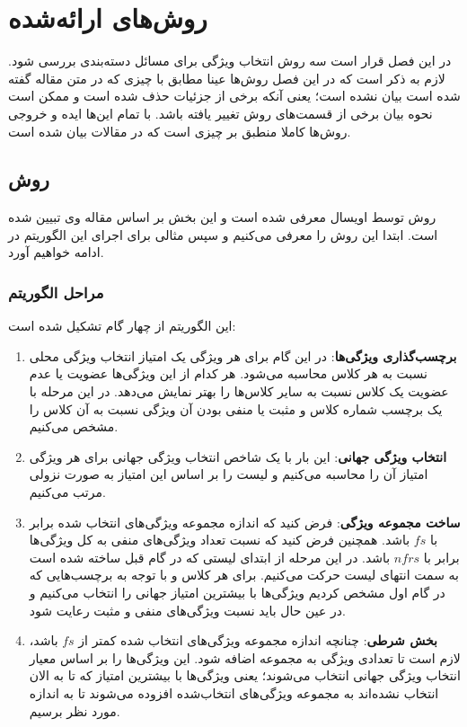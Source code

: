 \chapter{روش‌های ارائه‌شده}
در این فصل قرار است سه روش انتخاب ویژگی برای مسائل دسته‌بندی بررسی شود. لازم به ذکر است که در این فصل روش‌ها عینا مطابق با چیزی که در متن مقاله گفته شده است بیان نشده است؛ یعنی آنکه برخی از جزئیات حذف شده است و ممکن است نحوه بیان برخی از قسمت‌های روش تغییر یافته باشد. با تمام این‌ها ایده و خروجی روش‌ها کاملا منطبق بر چیزی است که در مقالات بیان شده است.


\section{روش } 
روش  توسط اویسال معرفی شده است\cite{uysal2016improved} و این بخش بر اساس مقاله وی تبیین شده است. ابتدا این روش را معرفی می‌کنیم و سپس مثالی برای اجرای این الگوریتم در ادامه خواهیم آورد.
\subsection{مراحل الگوریتم}
این الگوریتم از چهار گام تشکیل شده است:
\begin{enumerate}
\item \textbf{برچسب‌گذاری ویژگی‌ها}: در این گام برای هر ویژگی یک امتیاز انتخاب ویژگی محلی نسبت به هر کلاس محاسبه می‌شود. هر کدام از این ویژگی‌ها عضویت یا عدم عضویت یک کلاس نسبت به سایر کلاس‌ها را بهتر نمایش می‌دهد. در این مرحله با یک برچسب شماره کلاس و مثبت یا منفی بودن آن ویژگی نسبت به آن کلاس را مشخص می‌کنیم. 
\item \textbf{انتخاب ویژگی جهانی}: این بار با یک شاخص انتخاب ویژگی جهانی برای هر ویژگی امتیاز آن را محاسبه می‌کنیم و لیست را بر اساس این امتیاز به صورت نزولی مرتب می‌کنیم. 
\item \textbf{ساخت مجموعه ویژگی}: فرض کنید که اندازه مجموعه ویژگی‌های انتخاب شده برابر با 
$fs$
باشد. همچنین فرض کنید که نسبت تعداد ویژگی‌های منفی به کل ویژگی‌ها برابر با
$nfrs$
باشد. در این مرحله از ابتدای لیستی که در گام قبل ساخته شده است به سمت انتهای لیست حرکت می‌کنیم. برای هر کلاس و با توجه به برچسب‌هایی که در گام اول مشخص کردیم ویژگی‌ها با بیشترین امتیاز جهانی را انتخاب می‌کنیم و در عین حال باید نسبت ویژگی‌های منفی و مثبت رعایت شود.
\item \textbf{بخش شرطی}: چنانچه اندازه مجموعه ویژگی‌های انتخاب شده کمتر از $fs$ باشد، لازم است تا تعدادی ویژگی به مجموعه اضافه شود. این ویژگی‌ها را بر اساس معیار انتخاب ویژگی جهانی انتخاب می‌شوند؛ یعنی ویژگی‌ها با بیشترین امتیاز که تا به الان انتخاب نشده‌اند به مجموعه ویژگی‌های انتخاب‌شده افزوده می‌شوند تا به اندازه مورد نظر برسیم.
\end{enumerate}

